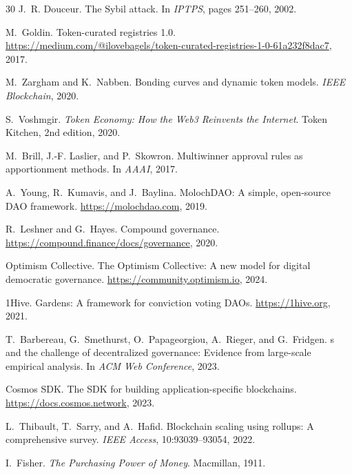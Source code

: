 \documentclass[conference]{IEEEtran}
\begin{document}
\begin{thebibliography}{30}
J.~R. Douceur.
\newblock The {S}ybil attack.
\newblock In \emph{IPTPS}, pages 251--260, 2002.

M.~Goldin.
\newblock Token-curated registries 1.0.
\newblock \url{https://medium.com/@ilovebagels/token-curated-registries-1-0-61a232f8dac7}, 2017.

M.~Zargham and K.~Nabben.
\newblock Bonding curves and dynamic token models.
\newblock \emph{IEEE Blockchain}, 2020.

S.~Voshmgir.
\newblock \emph{Token Economy: How the {W}eb3 Reinvents the Internet}.
\newblock Token Kitchen, 2nd edition, 2020.

M.~Brill, J.-F. Laslier, and P.~Skowron.
\newblock Multiwinner approval rules as apportionment methods.
\newblock In \emph{AAAI}, 2017.

A.~Young, R.~Kumavis, and J.~Baylina.
\newblock Moloch{DAO}: A simple, open-source {DAO} framework.
\newblock \url{https://molochdao.com}, 2019.

R.~Leshner and G.~Hayes.
\newblock Compound governance.
\newblock \url{https://compound.finance/docs/governance}, 2020.

Optimism Collective.
\newblock The Optimism Collective: A new model for digital democratic governance.
\newblock \url{https://community.optimism.io}, 2024.

1Hive.
\newblock Gardens: A framework for conviction voting {DAO}s.
\newblock \url{https://1hive.org}, 2021.

T.~Barbereau, G.~Smethurst, O.~Papageorgiou, A.~Rieger, and G.~Fridgen.
s and the challenge of decentralized governance: Evidence from large-scale empirical analysis.
\newblock In \emph{ACM Web Conference}, 2023.

Cosmos SDK.
\newblock The {SDK} for building application-specific blockchains.
\newblock \url{https://docs.cosmos.network}, 2023.

L.~Thibault, T.~Sarry, and A.~Hafid.
\newblock Blockchain scaling using rollups: A comprehensive survey.
\newblock \emph{IEEE Access}, 10:93039--93054, 2022.

I.~Fisher.
\newblock \emph{The Purchasing Power of Money}.
\newblock Macmillan, 1911.


\end{thebibliography}
\end{document}
